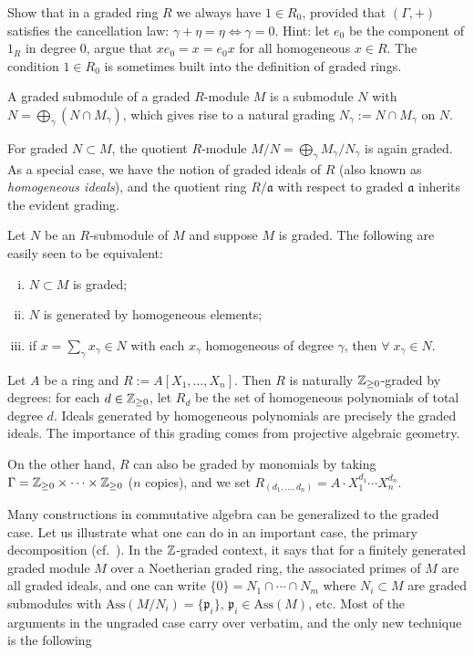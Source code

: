 \begin{exercise}
	Show that in a graded ring $R$ we always have $1 \in R_0$, provided that $(\Gamma, +)$ satisfies the cancellation law: $\gamma+\eta=\eta \iff \gamma=0$. Hint: let $e_0$ be the component of $1_R$ in degree 0, argue that $x e_0 = x = e_0 x$ for all homogeneous $x \in R$. The condition $1 \in R_0$ is sometimes built into the definition of graded rings.
\end{exercise}

\begin{definition}
	A graded submodule of a graded $R$-module $M$ is a submodule $N$ with $N = \bigoplus_\gamma (N \cap M_\gamma)$, which gives rise to a natural grading $N_\gamma := N \cap M_\gamma$ on $N$.
\end{definition}
For graded $N \subset M$, the quotient $R$-module $M/N = \bigoplus_\gamma M_\gamma/N_\gamma$ is again graded. As a special case, we have the notion of graded ideals of $R$ (also known as \emph{homogeneous ideals}), and the quotient ring $R/\mathfrak{a}$ with respect to graded $\mathfrak{a}$ inherits the evident grading.

Let $N$ be an $R$-submodule of $M$ and suppose $M$ is graded. The following are easily seen to be equivalent:
\begin{enumerate}[(i)]
	\item $N \subset M$ is graded;
	\item $N$ is generated by homogeneous elements;
	\item if $x = \sum_\gamma x_\gamma \in N$ with each $x_\gamma$ homogeneous of degree $\gamma$, then $\forall \; x_\gamma \in N$.
\end{enumerate}

\begin{example}
	Let $A$ be a ring and $R := A[X_1, \ldots, X_n]$. Then $R$ is naturally $\mathbb{Z}_{\geq 0}$-graded by degrees: for each $d \in \mathbb{Z}_{\geq 0}$, let $R_d$ be the set of homogeneous polynomials of total degree $d$. Ideals generated by homogeneous polynomials are precisely the graded ideals. The importance of this grading comes from projective algebraic geometry.

	On the other hand, $R$ can also be graded by monomials by taking $\Gamma = \mathbb{Z}_{\geq 0} \times \cdots \times \mathbb{Z}_{\geq 0}$ ($n$ copies), and we set $R_{(d_1, \ldots, d_n)} = A \cdot X_1^{d_1} \cdots X_n^{d_n}$.
\end{example}

Many constructions in commutative algebra can be generalized to the graded case. Let us illustrate what one can do in an important case, the primary decomposition (cf.\ \cite[\S 3.5 and Exercise 3.5]{Eis95}). In the $\mathbb{Z}$-graded context, it says that for a finitely generated graded module $M$ over a Noetherian graded ring, the associated primes of $M$ are all graded ideals, and one can write $\{0\} = N_1 \cap \cdots \cap N_m$ where $N_i \subset M$ are graded submodules with $\text{Ass}(M/N_i) = \{\mathfrak{p}_i\}$, $\mathfrak{p}_i \in \text{Ass}(M)$, etc. Most of the arguments in the ungraded case carry over verbatim, and the only new technique is the following

